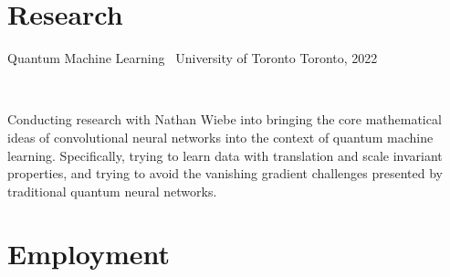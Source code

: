 \documentclass[]{style}
\begin{document}
\section{Research}

\begin{entrylist}

\vspace{2mm}

\entry
{Quantum Machine Learning \ {\normalfont University of Toronto}}
{Toronto, 2022}
{ ~ \vspace{-3.5mm}

Conducting research with Nathan Wiebe into bringing the core mathematical ideas of convolutional neural networks into the context of quantum machine learning. Specifically, trying to learn data with translation and scale invariant properties, and trying to avoid the vanishing gradient challenges presented by traditional quantum neural networks.
}

\end{entrylist}

\section{Employment}
\end{document}
